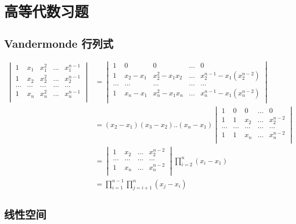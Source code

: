\documentclass[12pt,a4paper]{ctexart}
\begin{document}
\section{高等代数习题}

\subsection{Vandermonde 行列式}

\begin{align*}
    \begin{vmatrix}
       1 & x_1 & x_1^2 & ... & x_1^{n-1} \\
       1 & x_2 & x_2^2 & ... & x_2^{n-1} \\
       ... & ... & ... & ... & ...\\
       1 & x_n & x_n^2 & ... & x_n^{n-1} \\
    \end{vmatrix} &= 
    \begin{vmatrix}
       1 & 0 & 0 & ... & 0 \\
       1 & x_2-x_1 & x_2^2-x_1x_2 & ... & x_2^{n-1}-x_1(x_2^{n-2}) \\
       ... & ... & ... & ... & ...\\
       1 & x_n-x_1 & x_n^2-x_1x_n & ... & x_n^{n-1}-x_1(x_n^{n-2}) \\
    \end{vmatrix}  \\
    &= (x_2-x_1)(x_3-x_2)..(x_n-x_1) 
    \begin{vmatrix}
       1 & 0 & 0 & ... & 0 \\
       1 & 1 & x_2 & ... & x_2^{n-2} \\
       ... & ... & ... & ... & ...\\
       1 & 1 & x_n & ... & x_n^{n-2} \\
    \end{vmatrix}  \\
    &= \begin{vmatrix}
         1 & x_2 & ... & x_2^{n-2} \\
         ... & ... & ... & ...\\
         1 & x_n & ... & x_n^{n-2} \\
    \end{vmatrix}\prod_{i=2}^{n}(x_i-x_1) \\
    &= \prod_{i=1}^{n-1}\prod_{j=i+1}^{n}(x_j-x_i)
\end{align*}


\subsection{线性空间}
\end{document}
